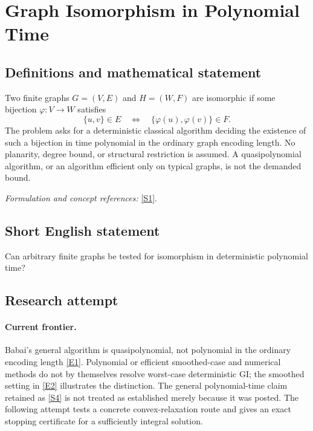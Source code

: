 \documentclass[11pt,a4paper]{article}
\numberwithin{equation}{section}
\newcommand{\sref}[2]{\hyperlink{source:#1:#2}{[S#2]}}
\newcommand{\eref}[2]{\hyperlink{extra:#1:#2}{[E#2]}}
\newif\ifshowcatalogue
\newcommand{\cataloguescope}[1]{\ifshowcatalogue
 \paragraph{Exact scope in the supplied catalogue.}
 \begin{quote}\small #1\end{quote}\fi}
\begin{document}
\setcounter{section}{78}
\section{\texorpdfstring{Graph Isomorphism in Polynomial Time}{Graph Isomorphism in Polynomial Time}}\label{79}
\subsection{Definitions and mathematical statement}
Two finite graphs $G=(V,E)$ and $H=(W,F)$ are isomorphic if some bijection $\varphi:V\to W$ satisfies
\[
 \{u,v\}\in E\quad\Longleftrightarrow\quad\{\varphi(u),\varphi(v)\}\in F.
\]
The problem asks for a deterministic classical algorithm deciding the existence of such a bijection in time polynomial in the ordinary graph encoding length. No planarity, degree bound, or structural restriction is assumed. A quasipolynomial algorithm, or an algorithm efficient only on typical graphs, is not the demanded bound.
\par\smallskip\textit{Formulation and concept references:} \sref{79}{1}.
\cataloguescope{Determine whether the graph isomorphism problem for general finite graphs is decidable by a deterministic classical Turing machine in polynomial time.}
\subsection{Short English statement}
Can arbitrary finite graphs be tested for isomorphism in deterministic polynomial time?
\subsection{Research attempt}

\paragraph{Current frontier.}
Babai's general algorithm is quasipolynomial, not polynomial in the ordinary
encoding length \eref{79}{1}. Polynomial or efficient smoothed-case and
numerical methods do not by themselves resolve worst-case deterministic
GI; the smoothed setting in \eref{79}{2} illustrates the distinction.
The general polynomial-time claim retained as \sref{79}{4} is not treated
as established merely because it was posted. The following attempt tests
a concrete convex-relaxation route and gives an exact stopping certificate
for a sufficiently integral solution.
\end{document}
